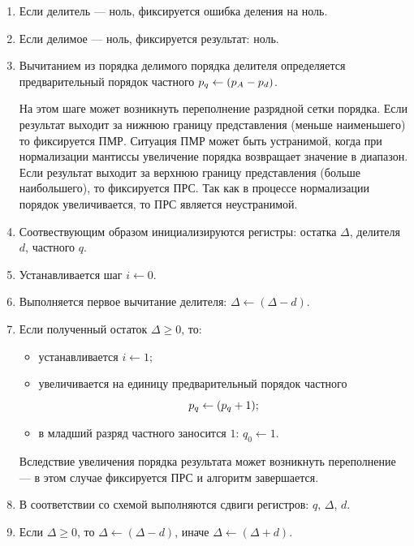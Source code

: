 \begin{enumerate}
    \item Если делитель --- ноль, фиксируется ошибка деления на ноль.
    
    \item Если делимое --- ноль, фиксируется результат: ноль.
    
    \item Вычитанием из порядка делимого порядка делителя определяется предварительный порядок частного $p_{q}\gets(p_{A}-p_{d})$. 
    
    На этом шаге может возникнуть переполнение разрядной сетки порядка. Если результат выходит за нижнюю границу представления (меньше наименьшего) то фиксируется ПМР. Ситуация ПМР может быть устранимой, когда при нормализации мантиссы увеличение порядка возвращает значение в диапазон. Если результат выходит за верхнюю границу представления (больше наибольшего), то фиксируется ПРС. Так как в процессе нормализации порядок увеличивается, то ПРС является неустранимой.
    
    \item Соотвествующим образом инициализируются регистры: остатка $\Delta$, делителя $d$, частного $q$.
    
    \item Устанавливается шаг $i\gets 0$.
    
    \item Выполняется первое вычитание делителя: $\Delta\gets(\Delta - d)$.
    
    \item Если полученный остаток $\Delta \geq 0$, то: 
    \begin{itemize}
        \item устанавливается $i\gets 1$;
        \item увеличивается на единицу предварительный порядок частного \[p_{q}\gets(p_{q} + 1);\]
        \item в младший разряд частного заносится $1$: $q_0\gets 1$.
    \end{itemize}
    
    Вследствие увеличения порядка результата может возникнуть переполнение --- в этом случае фиксируется ПРС и алгоритм завершается.
    
    \item В соответствии со схемой выполняются сдвиги регистров: $q$, $\Delta$, $d$.
    
    \item\label{fdiv:wvo:loop} Если $\Delta\ge 0$, то $\Delta\gets(\Delta - d)$, иначе $\Delta\gets(\Delta + d)$.
    

\end{enumerate}
